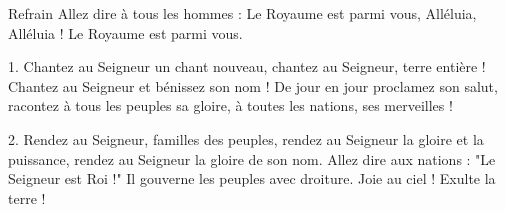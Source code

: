 Refrain Allez dire à tous les hommes :
Le Royaume est parmi vous, Alléluia, Alléluia !
Le Royaume est parmi vous.

1. Chantez au Seigneur un chant nouveau,
chantez au Seigneur, terre entière !
Chantez au Seigneur et bénissez son nom !
De jour en jour proclamez son salut,
racontez à tous les peuples sa gloire,
à toutes les nations, ses merveilles !

2.
Rendez au Seigneur, familles des peuples,
rendez au Seigneur la gloire et la puissance,
rendez au Seigneur la gloire de son nom.
Allez dire aux nations : "Le Seigneur est Roi !"
Il gouverne les peuples avec droiture.
Joie au ciel ! Exulte la terre !
